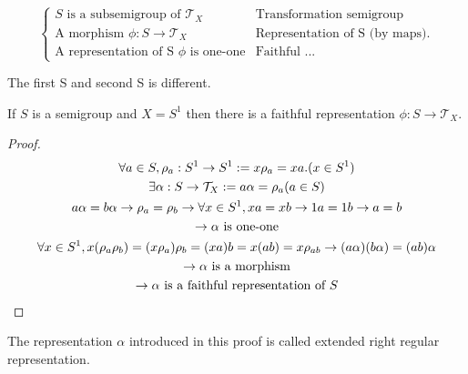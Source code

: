 \begin{Def}
    \[\begin{cases}
        S \text{ is a subsemigroup of }\mathcal{T}_X   &   \text{Transformation semigroup} \\
        \text{A morphism }\phi: S \rightarrow \mathcal{T}_X &   \text{Representation of S (by maps).}   \\
        \text{A representation of S }\phi \text{ is one-one} &  \text{Faithful ...}
    \end{cases}\]
    
    The first S and second S is different.
\end{Def}

\begin{Them}
    If $S$ is a semigroup and $X=S^1$ then there is a faithful representation $\phi:S \rightarrow \mathcal{T}_X$.
    \begin{proof}
        \begin{gather*}
            \forall a \in S, \rho_a : S^1\rightarrow S^1:= x\rho_a=xa. (x\in S^1)    \\
            \exists \alpha: S\rightarrow\mathcal{T}_X:=a\alpha=\rho_a(a\in S)   \\
            a\alpha=b\alpha \rightarrow \rho_a=\rho_b\rightarrow  \forall x \in S^1,xa=xb\rightarrow 1a=1b \rightarrow a=b  \\
            \rightarrow \alpha \text{\space is one-one} \\
            \forall x \in S^1,x(\rho_a\rho_b)=(x\rho_a)\rho_b=(xa)b=x(ab)=x\rho_{ab} \rightarrow (a\alpha)(b\alpha)=(ab)\alpha  \\
            \rightarrow \alpha \text{\space is a morphism}  \\
            \rightarrow \alpha \text{\space is a faithful representation of }S
        \end{gather*}
    \end{proof}

    The representation $\alpha$ introduced in this proof is called extended right regular representation.
\end{Them}


